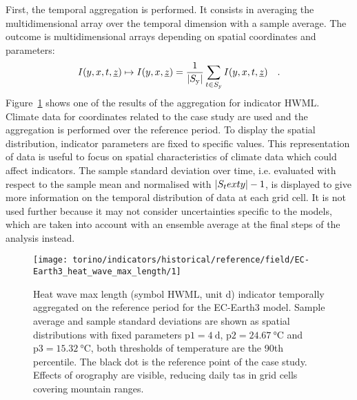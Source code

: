 First, the temporal aggregation is performed. It consists in averaging the multidimensional array over the temporal dimension with a sample average. The outcome is multidimensional arrays depending on spatial coordinates and parameters:
\begin{equation}
  \label{eq:temporal_aggregation}
  I(y, x, t, \underline{z}) \mapsto I(y, x, \underline{z}) = \frac{1}{\lvert S_\text{y}\rvert} \sum_{t \in S_\text{y}} I(y, x, t, \underline{z})
  \quad .
\end{equation}
Figure~\ref{fig:historical_reference_field_EC-Earth3_heat_wave_max_length} shows one of the results of the aggregation for \gls{indicator} $\mathrm{HWML}$. Climate data for coordinates related to the case study are used and the aggregation is performed over the reference period. To display the spatial distribution, indicator parameters are fixed to specific values. This representation of data is useful to focus on spatial characteristics of climate data which could affect indicators. The sample standard deviation over time, i.e. evaluated with respect to the sample mean and normalised with $\lvert S_ text{y}\rvert - 1$, is displayed to give more information on the temporal distribution of data at each grid cell. It is not used further because it may not consider uncertainties specific to the models, which are taken into account with an ensemble average at the final steps of the analysis instead.

\begin{figure}[h]
  \centering
  \texttt{[image: torino/indicators/historical/reference/field/EC-Earth3\_heat\_wave\_max\_length/1]}
  \caption{{Heat wave max length} (symbol $\mathrm{HWML}$, unit \unit{\day}) indicator temporally aggregated on the reference period for the EC-Earth3 model. Sample average and sample standard deviations are shown as spatial distributions with fixed parameters $\mathrm{p1} = \qty{4}{\day}$, $\mathrm{p2} = \qty{24.67}{\degreeCelsius}$ and $\mathrm{p3} = \qty{15.32}{\degreeCelsius}$, both thresholds of temperature are the 90th percentile. The black dot is the reference point of the case study. Effects of orography are visible, reducing daily \gls{tas} in grid cells covering mountain ranges.}
  \label{fig:historical_reference_field_EC-Earth3_heat_wave_max_length}
\end{figure}

